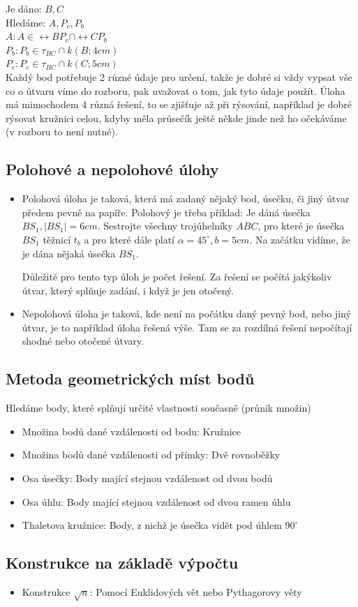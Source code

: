 \documentclass[12pt]{article}
\begin{document}
Je dáno: $B, C$\\
Hledáme: $A, P_c, P_b$\\
$A: A\in \leftrightarrow BP_c \cap  \leftrightarrow CP_b$\\
$P_b: P_b\in \tau_{BC} \cap k(B;4cm)$\\
$P_c: P_c \in \tau_{BC} \cap k(C;5cm)$\\

Každý bod potřebuje 2 různé údaje pro určení, takže je dobré si vždy vypsat vše co o útvaru víme do rozboru, pak uvažovat o tom, jak tyto údaje použít. Úloha má mimochodem 4 různá řešení, to se zjišťuje až při rýsování, například je dobré rýsovat kružnici celou, kdyby měla průsečík ještě někde jinde než ho očekáváme (v rozboru to není nutné).

\subsection*{Polohové a nepolohové úlohy}
\begin{itemize}
    \item Polohová úloha je taková, která má zadaný nějaký bod, úsečku, či jiný útvar předem pevně na papíře. Polohový je třeba příklad: Je dáná úsečka $BS_1, |BS_1| = 6cm$. Sestrojte všechny trojúhelníky $ABC$, pro které je úsečka $BS_1$ těžnicí $t_b$ a pro které dále platí $\alpha = 45^\circ, b = 5 cm$. Na začátku vidíme, že je dána nějaká úsečka $BS_1$.
    
    Důležité pro tento typ úloh je počet řešení. Za řešení se počítá jakýkoliv útvar, který splňuje zadání, i když je jen otočený.
    \item Nepolohová úloha je taková, kde není na počátku daný pevný bod, nebo jiný útvar, je to například úloha řešená výše. Tam se za rozdílná řešení nepočítají shodné nebo otočené útvary.
\end{itemize}
\subsection*{Metoda geometrických míst bodů}
Hledáme body, které splňují určité vlastnosti současně (průnik množin)
\begin{itemize}
    \item Množina bodů dané vzdálenosti od bodu: Kružnice
    \item Množina bodů dané vzdálenosti od přímky: Dvě rovnoběžky
    \item Osa úsečky: Body mající stejnou vzdálenost od dvou bodů
    \item Osa úhlu: Body mající stejnou vzdálenost od dvou ramen úhlu
    \item Thaletova kružnice: Body, z nichž je úsečka vidět pod úhlem $90^\circ$
\end{itemize}

\subsection*{Konstrukce na základě výpočtu}
\begin{itemize}
    \item Konstrukce $\sqrt{n}$: Pomocí Euklidových vět nebo Pythagorovy věty
\end{itemize}
\end{document}
